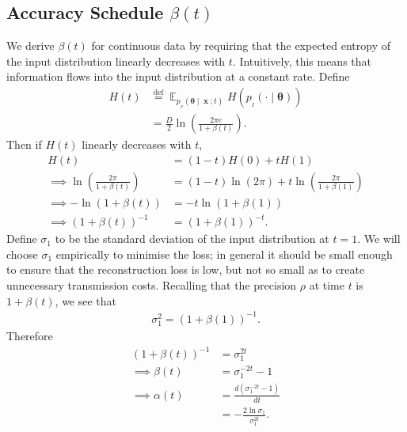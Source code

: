 \documentclass[11pt,table]{article}
\DeclareMathOperator*{\E}{\mathbb{E}}
\DeclareMathOperator{\x}{\mathbf{x}}
\newcommand*{\defeq}{\stackrel{\text{def}}{=}}
\renewcommand{\vec}[1]{\boldsymbol{#1}}
\newcommand{\pars}{\theta}
\newcommand{\parsn}{\vec{\pars}}
\newcommand{\0}[1]{\constvec{0}{#1}}
\newcommand{\1}[1]{\constvec{1}{#1}}
\newcommand{\inp}{p_{_I}}
\newcommand{\flow}{p_{_F}}
\begin{document}
\subsection{Accuracy Schedule \texorpdfstring{$\beta(t)$}{}}\label{sec:cts_beta}
We derive $\beta(t)$ for continuous data by requiring that the expected entropy of the input distribution linearly decreases with $t$.
Intuitively, this means that information flows into the input distribution at a constant rate.
Define
\begin{align}
H(t) &\defeq \E_{\flow(\parsn \mid \x; t)} H(\inp(\cdot \mid \parsn))\\
&= \frac{D}{2} \ln \left(\frac{2\pi e}{1 + \beta(t)}\right).
\end{align}
Then if $H(t)$ linearly decreases with $t$,
\begin{align}
H(t) &= (1-t)H(0) + tH(1)\\
\implies \ln \left(\frac{2\pi}{1 + \beta(t)}\right) &= (1-t)\ln (2 \pi) + t \ln \left(\frac{2\pi}{1 + \beta(1)}\right)\\
\implies -\ln (1+\beta(t)) &= -t\ln(1+\beta(1))\\
\implies (1+\beta(t))^{-1} &= (1+\beta(1))^{-t}.\label{pvs}
\end{align}
Define $\sigma_1$ to be the standard deviation of the input distribution at $t=1$. 
We will choose $\sigma_1$ empirically to minimise the loss; in general it should be small enough to ensure that the reconstruction loss is low, but not so small as to create unnecessary transmission costs.
Recalling that the precision $\rho$ at time $t$ is $1+\beta(t)$, we see that
\begin{align}
\sigma_1^2 = (1 + \beta(1))^{-1}.
\end{align}
Therefore
\begin{align}
(1+\beta(t))^{-1} &= \sigma_1^{2t}\\
\implies \beta(t) &= \sigma_1^{-2t} - 1\label{cts_beta_t}\\
\implies \alpha(t) &= \frac{d \left(\sigma_1^{-2t} - 1\right)}{dt}\\
&= -\frac{2 \ln \sigma_1}{\sigma_1^{2t}}\label{ctsalphat}.
\end{align}
\end{document}
